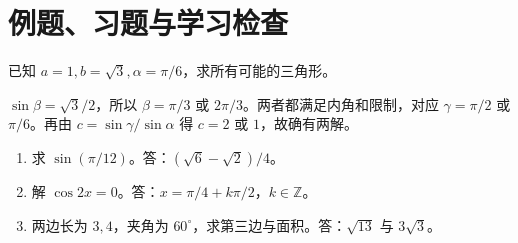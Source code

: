 \section{例题、习题与学习检查}
\begin{example}
已知 $a=1,b=\sqrt3,\alpha=\pi/6$，求所有可能的三角形。
\end{example}
\begin{solve}
$\sin\beta=\sqrt3/2$，所以 $\beta=\pi/3$ 或 $2\pi/3$。两者都满足内角和限制，对应 $\gamma=\pi/2$ 或 $\pi/6$。再由 $c=\sin\gamma/\sin\alpha$ 得 $c=2$ 或 $1$，故确有两解。
\end{solve}
\begin{enumerate}
\item 求 $\sin(\pi/12)$。答：$(\sqrt6-\sqrt2)/4$。
\item 解 $\cos2x=0$。答：$x=\pi/4+k\pi/2$，$k\in\mathbb Z$。
\item 两边长为 $3,4$，夹角为 $60^\circ$，求第三边与面积。答：$\sqrt{13}$ 与 $3\sqrt3$。
\end{enumerate}

